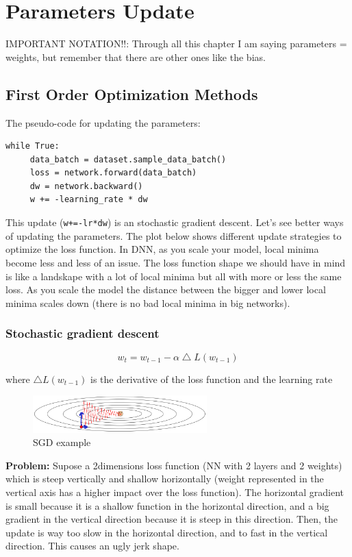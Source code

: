 \chapter{Parameters Update}

IMPORTANT NOTATION!!: Through all this chapter I am saying parameters = weights, but remember that there are other ones like the bias.

\section*{First Order Optimization Methods}
The pseudo-code for updating the parameters:
\begin{lstlisting}[frame=single]
while True:
     data_batch = dataset.sample_data_batch()
     loss = network.forward(data_batch)
     dw = network.backward()
     w += -learning_rate * dw
\end{lstlisting}

This update (\texttt{w+=-lr*dw}) is an stochastic gradient descent. Let's see better ways of updating the parameters. The plot below shows different update strategies to optimize the loss function. In DNN, as you scale your model, local minima become less and less of an issue. The loss function shape we should have in mind is like a landskape with a lot of local minima but all with more or less the same loss. As you scale the model the distance between the bigger and lower local minima scales down (there is no bad local minima in big networks).

\subsection*{Stochastic gradient descent}
\begin{equation}
w_t = w_{t-1} -\alpha \bigtriangleup L(w_{t-1})
\end{equation}

where $\bigtriangleup L(w_{t-1})$ is the derivative of the loss function and  the learning rate

\begin{figure}[h]
  \centering
  \includegraphics[width=0.6\textwidth]{Images/params_up/1.png}
  \caption{SGD example}
\end{figure}

\textbf{Problem:}
Supose a 2dimensions loss function (NN with 2 layers and 2 weights) which is steep vertically and shallow horizontally (weight represented in the vertical axis has a higher impact over the loss function). The horizontal gradient is small because it is a shallow function in the horizontal direction, and a big gradient in the vertical direction because it is steep in this direction. Then, the update is way too slow in the horizontal direction, and to fast in the vertical direction. This causes an ugly jerk shape.

